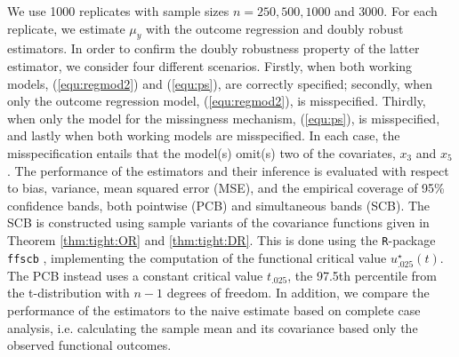 \documentclass[12pt, A4]{article}
\begin{document}
        We use 1000 replicates with sample sizes $n = 250, 500, 1000$ and $3000$. 
        For each replicate, we estimate $\mu_y$ with the outcome regression and doubly robust estimators.
        In order to confirm the doubly robustness property of the latter estimator, we consider four different scenarios. 
        Firstly, when both working models, (\ref{equ:regmod2}) and (\ref{equ:ps}),  are correctly specified; secondly, when only the outcome regression model, (\ref{equ:regmod2}), is misspecified. 
        Thirdly, when only the model for the missingness mechanism, (\ref{equ:ps}), is misspecified, and lastly when both working models are misspecified. 
        In each case, the misspecification entails that the model(s) omit(s) two of the covariates, $x_3$ and $x_5$. 
        The performance of the estimators and their inference is evaluated with respect to bias, variance, mean squared error (MSE), and the empirical coverage of 95\% confidence bands, both pointwise (PCB) and simultaneous bands (SCB). 
        The SCB is constructed using sample variants of the covariance functions given in Theorem \ref{thm:tight:OR} and \ref{thm:tight:DR}. 
        This is done using the \texttt{R}-package \texttt{ffscb} \cite{ffscb}, implementing the computation of the functional critical value $\mathit{u}^\star_{.025}(t)$. 
        The PCB instead uses a constant critical value $t_{.025}$, the 97.5th percentile from the t-distribution with $n-1$ degrees of freedom. 
        In addition, we compare the performance of the estimators to the naive estimate based on complete case analysis, i.e. calculating the sample mean and its covariance based only the observed functional outcomes. 
\end{document}
